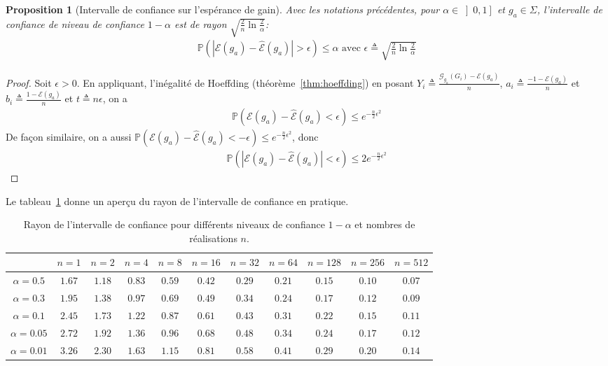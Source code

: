 \documentclass[10pt,a4paper]{article}
\theoremstyle{plain} %
\newtheorem{propo}{Proposition}
\theoremstyle{definition} %
\theoremstyle{remark} %
\newcommand{\proba}[1]{\mathbb{P}\left (#1\right )}
\newcommand{\gain}[2]{\mathcal{G}_{#1}\left (#2\right )}
\newcommand{\espgain}[1]{\mathcal{E}\left (#1\right )}
\newcommand{\moygain}[1]{\widehat{\mathcal{E}}\left (#1\right )}
\begin{document}
\begin{propo}[Intervalle de confiance sur l'espérance de gain] Avec les notations précédentes, pour $\alpha \in \left ]0, 1\right ]$ et $g_a\in\Sigma$, l'intervalle de confiance de niveau de confiance $1-\alpha$ est de rayon $\sqrt{\frac{2}{n}\ln \frac{2}{\alpha}}$:
\begin{align}
\proba{\left |\espgain{g_a}-\moygain{g_a}\right | > \epsilon} \leq \alpha
\text{ avec }
\epsilon \triangleq \sqrt{\frac{2}{n}\ln \frac{2}{\alpha}}
\label{eqn:intervalle_confiance}
\end{align}
\end{propo}

\begin{proof}
Soit $\epsilon>0$. En appliquant, l'inégalité de Hoeffding (théorème~\ref{thm:hoeffding}) en posant $Y_i \triangleq \frac{\gain{g_a}{G_i}-\espgain{g_a}}{n}$, $a_i\triangleq\frac{-1-\espgain{g_a}}{n}$ et $b_i\triangleq\frac{1-\espgain{g_a}}{n}$ et $t\triangleq n\epsilon$, on a
\begin{align}
\proba{\espgain{g_a}-\moygain{g_a} < \epsilon} \leq e^{-\frac{n}{2}\epsilon^2}
\end{align}
De façon similaire, on a aussi $\proba{\espgain{g_a}-\moygain{g_a} < -\epsilon} \leq e^{-\frac{n}{2}\epsilon^2}$, donc 
\begin{align}
\proba{\left |\espgain{g_a}-\moygain{g_a}\right | < \epsilon} \leq 2 e^{-\frac{n}{2}\epsilon^2}
\end{align}
\end{proof}

Le tableau~\ref{tab:ic} donne un aperçu du rayon de l'intervalle de confiance en pratique.

\begin{table}[tbh]
\begin{tabular}{|c|c|c|c|c|c|c|c|c|c|c|}
\hline
& $n=1$ & $n=2$ & $n=4$ & $n=8$ & $n=16$ & $n=32$ & $n=64$ & $n=128$ & $n=256$ & $n=512$ \\
\hline
$\alpha = 0.5$ & $1.67$ & $1.18$ & $0.83$ & $0.59$ & $0.42$ & $0.29$ & $0.21$ & $0.15$ & $0.10$ & $0.07$ \\
\hline
$\alpha = 0.3$ & $1.95$ & $1.38$ & $0.97$ & $0.69$ & $0.49$ & $0.34$ & $0.24$ & $0.17$ & $0.12$ & $0.09$ \\
\hline
$\alpha = 0.1$ & $2.45$ & $1.73$ & $1.22$ & $0.87$ & $0.61$ & $0.43$ & $0.31$ & $0.22$ & $0.15$ & $0.11$ \\
\hline
$\alpha = 0.05$ & $2.72$ & $1.92$ & $1.36$ & $0.96$ & $0.68$ & $0.48$ & $0.34$ & $0.24$ & $0.17$ & $0.12$ \\
\hline
$\alpha = 0.01$ & $3.26$ & $2.30$ & $1.63$ & $1.15$ & $0.81$ & $0.58$ & $0.41$ & $0.29$ & $0.20$ & $0.14$ \\
\hline
\end{tabular}
\caption{Rayon de l'intervalle de confiance pour différents niveaux de confiance $1-\alpha$ et nombres de réalisations $n$.}
\label{tab:ic}
\end{table}
\end{document}
